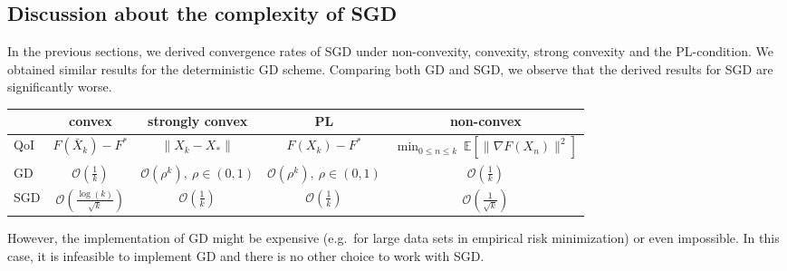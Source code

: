 \documentclass[12pt,openany]{book}
\theoremstyle{definition}
\theoremstyle{definition}
\newcommand{\cO}{\mathcal{O}}
\newcommand{\E}{\mathbb{E}}
\begin{document}
\subsection{Discussion about the complexity of SGD}

In the previous sections, we derived convergence rates of SGD under non-convexity, convexity, strong convexity and the PL-condition. We obtained similar results for the deterministic GD scheme. Comparing both GD and SGD, we observe that the derived results for SGD are significantly worse. 

\begin{center}
\begin{tabular}{|l|c|c|c|c|}
\hline
\ & convex & strongly convex & PL & non-convex \\
\hline
QoI & $F(\bar X_k) - F^\ast$ & $\|X_k-X_\ast\|$ & $F(X_k)-F^\ast$ & $\min_{0\le n\le k}\ \E[\|\nabla F(X_n)\|^2]$ \\
\hline \hline
GD & $\cO\left(\frac{1}{k}\right)$ & $\cO(\rho^k),\ \rho\in(0,1)$ & $\cO(\rho^k),\ \rho\in(0,1)$ & $\cO\left(\frac{1}{k}\right)$\\
\hline
SGD & $\cO\left(\frac{\log(k)}{\sqrt{k}}\right)$ & $\cO(\frac1{k})$ & $\cO(\frac1{k})$ & $\cO\left(\frac{1}{\sqrt{k}}\right)$ \\
\hline
\end{tabular}
\end{center}
However, the implementation of GD might be expensive (e.g.~for large data sets in empirical risk minimization) or even impossible. In this case, it is infeasible to implement GD and there is no other choice to work with SGD. 
\end{document}
